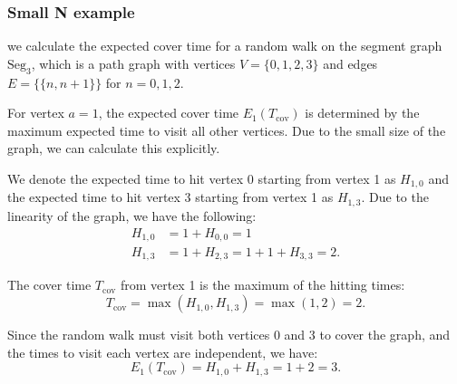 \begin{solution}
\begin{enumerate}[(a)]
		\subsubsection*{Small N example}
		we calculate the expected cover time for a random walk on the segment graph \( \text{Seg}_3 \), which is a path graph with vertices \( V = \{0, 1, 2, 3\} \) and edges \( E = \{\{n, n+1\}\} \) for \( n = 0, 1, 2 \).
		
		For vertex \( a = 1 \), the expected cover time \( E_1(T_{\text{cov}}) \) is determined by the maximum expected time to visit all other vertices. Due to the small size of the graph, we can calculate this explicitly.
		
		We denote the expected time to hit vertex 0 starting from vertex 1 as \( H_{1,0} \) and the expected time to hit vertex 3 starting from vertex 1 as \( H_{1,3} \). Due to the linearity of the graph, we have the following:
		\begin{align*}
			H_{1,0} &= 1 + H_{0,0} = 1 \\
			H_{1,3} &= 1 + H_{2,3} = 1 + 1 + H_{3,3} = 2.
		\end{align*}
		
		The cover time \( T_{\text{cov}} \) from vertex 1 is the maximum of the hitting times:
		\begin{equation*}
			T_{\text{cov}} = \max(H_{1,0}, H_{1,3}) = \max(1, 2) = 2.
		\end{equation*}
		
		Since the random walk must visit both vertices 0 and 3 to cover the graph, and the times to visit each vertex are independent, we have:
		\begin{equation*}
			E_1(T_{\text{cov}}) = H_{1,0} + H_{1,3} = 1 + 2 = 3.
		\end{equation*}
		
	\end{enumerate}
\end{solution}



